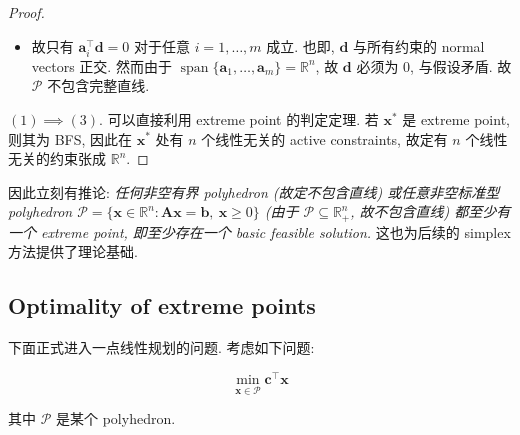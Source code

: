 \begin{thmblock}
\begin{proof}{}
\begin{itemize}
\item {}故只有 $\bm{a}_i^\top \bm{d} = 0$ 对于任意 $i = 1, \dots, m$ 成立. 也即, $\bm{d}$ 与所有约束的 normal vectors 正交. 然而由于 $\operatorname{span}\{\bm{a}_1, \dots, \bm{a}_m\} = \mathbb{R}^n$, 故 $\bm{d}$ 必须为 $0$, 与假设矛盾. 故 $\mathcal{P}$ 不包含完整直线.


\end{itemize}

\textbf{$(1) \implies (3)$}. 可以直接利用 extreme point 的判定定理. 若 $\bm{x}^*$ 是 extreme point, 则其为 BFS, 因此在 $\bm{x}^*$ 处有 $n$ 个线性无关的 active constraints, 故定有 $n$ 个线性无关的约束张成 $\mathbb{R}^n$.

\end{proof}

\end{thmblock}


\begin{colblock}{}
因此立刻有推论: \emph{任何非空有界 polyhedron (故定不包含直线) 或任意非空标准型 polyhedron $\mathcal{P} = \{\bm{x} \in \mathbb{R}^n: \bm{A}\bm{x} = \bm{b},~ \bm{x} \geq 0\}$ (由于 $\mathcal{P} \subseteq \mathbb{R}^n_+$, 故不包含直线) 都至少有一个 extreme point, 即至少存在一个 basic feasible solution.} 这也为后续的 simplex 方法提供了理论基础.

\end{colblock}

\subsection{Optimality of extreme points}

下面正式进入一点线性规划的问题. 考虑如下问题:

\[
\min_{\bm{x} \in \mathcal{P}} \bm{c}^\top \bm{x} \tag{LP}
\]

其中 $\mathcal{P}$ 是某个 polyhedron.


